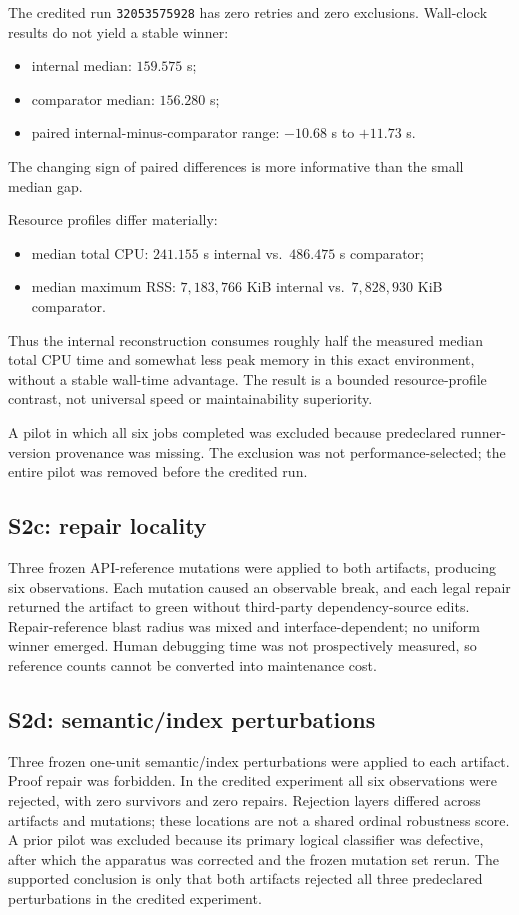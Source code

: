 \documentclass[sigplan,10pt,anonymous,review]{acmart}
\newcommand{\code}[1]{\texttt{#1}}
\begin{document}
The credited run \code{32053575928} has zero retries and zero exclusions. Wall-clock results do not yield a stable winner:
\begin{itemize}
\item internal median: $159.575$ s;
\item comparator median: $156.280$ s;
\item paired internal-minus-comparator range: $-10.68$ s to $+11.73$ s.
\end{itemize}
The changing sign of paired differences is more informative than the small median gap.

Resource profiles differ materially:
\begin{itemize}
\item median total CPU: $241.155$ s internal vs.\ $486.475$ s comparator;
\item median maximum RSS: $7{,}183{,}766$ KiB internal vs.\ $7{,}828{,}930$ KiB comparator.
\end{itemize}
Thus the internal reconstruction consumes roughly half the measured median total CPU time and somewhat less peak memory in this exact environment, without a stable wall-time advantage. The result is a bounded resource-profile contrast, not universal speed or maintainability superiority.

A pilot in which all six jobs completed was excluded because predeclared runner-version provenance was missing. The exclusion was not performance-selected; the entire pilot was removed before the credited run.

\subsection{S2c: repair locality}
Three frozen API-reference mutations were applied to both artifacts, producing six observations. Each mutation caused an observable break, and each legal repair returned the artifact to green without third-party dependency-source edits. Repair-reference blast radius was mixed and interface-dependent; no uniform winner emerged. Human debugging time was not prospectively measured, so reference counts cannot be converted into maintenance cost.

\subsection{S2d: semantic/index perturbations}
Three frozen one-unit semantic/index perturbations were applied to each artifact. Proof repair was forbidden. In the credited experiment all six observations were rejected, with zero survivors and zero repairs. Rejection layers differed across artifacts and mutations; these locations are not a shared ordinal robustness score. A prior pilot was excluded because its primary logical classifier was defective, after which the apparatus was corrected and the frozen mutation set rerun. The supported conclusion is only that both artifacts rejected all three predeclared perturbations in the credited experiment.
\end{document}
